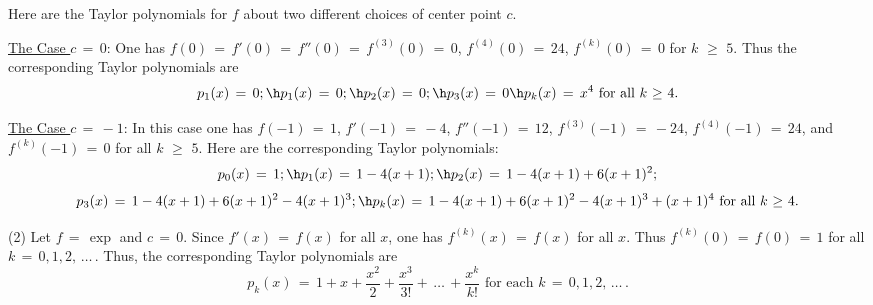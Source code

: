 {        Here are the Taylor polynomials for $f$ about two different choices of center point $c$.

        \underline{The Case $c \,=\, 0$}: One has $f(0) \,=\, f'(0) \,=\, f''(0) \,=\, f^{(3)}(0) \,=\, 0$, $f^{(4)}(0) \,=\, 24$, $f^{(k)}(0) \,=\, 0$ for $k\,\,{\geq}\,\,5$.
    Thus the corresponding Taylor polynomials are
        \begin{displaymath}
        p_{1}(x) \,=\, 0; \h p_{1}(x) \,=\, 0; \h p_{2}(x) \,=\, 0; \h p_{3}(x) \,=\, 0 \h p_{k}(x) \,=\, x^{4} \mbox{ for all $k\,\,{\geq}\,\,4$}.
        \end{displaymath}

        \underline{The Case $c \,=\, -1$}: In this case one has $f(-1) \,=\, 1$, $f'(-1) \,=\, -4$, $f''(-1) \,=\, 12$,
    $f^{(3)}(-1) \,=\, -24$, $f^{(4)}(-1) \,=\, 24$, and $f^{(k)}(-1) \,=\, 0$ for all $k\,\,{\geq}\,\,5$.
    Here are the corresponding Taylor polynomials:
        \begin{displaymath}
        p_{0}(x) \,=\, 1; \h p_{1}(x) \,=\, 1-4(x+1); \h p_{2}(x) \,=\, 1-4(x+1) + 6(x+1)^{2};
        \end{displaymath}
        \begin{displaymath}
        p_{3}(x) \,=\, 1-4(x+1) + 6(x+1)^{2} - 4(x+1)^{3}; \h p_{k}(x) \,=\, 1-4(x+1) + 6(x+1)^{2} - 4(x+1)^{3} + (x+1)^{4} \mbox{ for all $k\,\,{\geq}\,\,4$}.
        \end{displaymath}

\V

        (2) Let $f \,=\, {\exp}$ and $c \,=\, 0$. Since $f'(x) \,=\, f(x)$ for all $x$, one has $f^{(k)}(x) \,=\, f(x)$ for all $x$.
    Thus $f^{(k)}(0) \,=\, f(0) \,=\, 1$ for all $k \,=\, 0,1,2,\,{\ldots}\,$.
    Thus, the corresponding Taylor polynomials are
        \begin{displaymath}
        p_{k}(x) \,=\, 1 + x + \frac{x^{2}}{2} + \frac{x^{3}}{3!} + \,{\ldots}\, + \frac{x^{k}}{k!} \mbox{ for each $k \,=\, 0,1,2,\,{\ldots}\,$}.
        \end{displaymath}

\V

}
